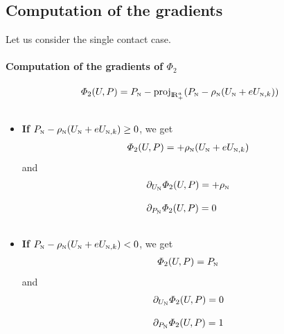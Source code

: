 \subsection{Computation of the gradients}


Let us consider the single contact case.
\paragraph{Computation of the gradients of $\Phi_2$}
\begin{equation}
  \label{eq:AC-T1}
  \begin{array}{l}
  \varPhi_2(U,P) =  P_{{\hbox{\tiny{N}}}} - \operatorname{proj}_{\mathrm{I\!R}^{a}_+} (P_{{\hbox{\tiny{N}}}} - \rho_{{\hbox{\tiny{N}}}} (U_{{\hbox{\tiny{N}}}} +e  U_{{\hbox{\tiny{N}}},k}) ) \\ \\
\end{array}
\end{equation}
\begin{itemize}
\item \textbf{If} $P_{{\hbox{\tiny{N}}}} - \rho_{{\hbox{\tiny{N}}}} (U_{{\hbox{\tiny{N}}}} +e  U_{{\hbox{\tiny{N}}},k}) \geq 0 $, we get
  \begin{equation}
    \label{eq:AC-T2}
    \begin{array}{l}
      \varPhi_2(U,P) =  + \rho_{{\hbox{\tiny{N}}}} (U_{{\hbox{\tiny{N}}}} +e  U_{{\hbox{\tiny{N}}},k})
    \end{array}
  \end{equation}
  and
  \begin{equation}
    \label{eq:AC-T3}
    \begin{array}{l}
     \partial_{U_{{\hbox{\tiny{N}}}}} \varPhi_2(U,P) =  + \rho_{{\hbox{\tiny{N}}}} \\ \\
     \partial_{P_{{\hbox{\tiny{N}}}}} \varPhi_2(U,P) =  0 \\ \\
    \end{array}
  \end{equation}
\item \textbf{If} $P_{{\hbox{\tiny{N}}}} - \rho_{{\hbox{\tiny{N}}}} (U_{{\hbox{\tiny{N}}}} +e  U_{{\hbox{\tiny{N}}},k})  < 0 $, we get
  \begin{equation}
    \label{eq:AC-T4}
    \begin{array}{l}
      \varPhi_2(U,P) =  P_{{\hbox{\tiny{N}}}}
    \end{array}
  \end{equation}
  and
  \begin{equation}
    \label{eq:AC-T5}
    \begin{array}{l}
     \partial_{U_{{\hbox{\tiny{N}}}}} \varPhi_2(U,P) =  0 \\ \\
     \partial_{P_{{\hbox{\tiny{N}}}}} \varPhi_2(U,P) =  1 \\ \\
    \end{array}
  \end{equation}
\end{itemize}
